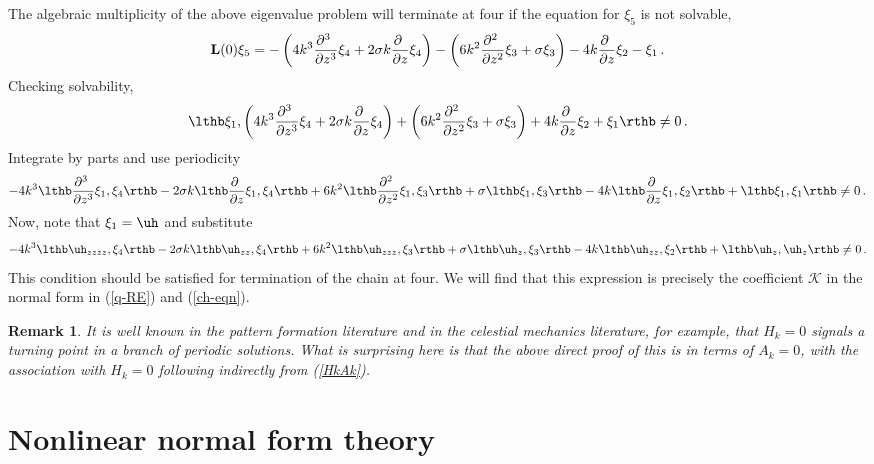 \documentclass[10pt]{article}
\newtheorem{rmk}[thm]{Remark}
\begin{document}
The algebraic multiplicity of the above eigenvalue problem will terminate at
four if the equation for $\xi_5$ is not solvable,
%
\begin{equation}\label{xi5-eqn}
{\bf L}(0)\xi_5 = -\left( 4k^3 \frac{\partial^3\ }{\partial z^3}\xi_4
 + 2\sigma k \frac{\partial\ }{\partial z}\xi_4\right) -
\left( 6k^2\frac{\partial^2\ }{\partial z^2}\xi_3 + \sigma\xi_3\right)
 - 4k \frac{\partial\ }{\partial z}\xi_2 - \xi_1\,.
\end{equation}
%
Checking solvability,
\[
\lthb \xi_1,\left( 4k^3 \frac{\partial^3\ }{\partial z^3}\xi_4
 + 2\sigma k \frac{\partial\ }{\partial z}\xi_4\right) +
\left( 6k^2\frac{\partial^2\ }{\partial z^2}\xi_3 + \sigma\xi_3\right)
 + 4k \frac{\partial\ }{\partial z}\xi_2 + \xi_1\rthb \neq 0 \,.
\]
Integrate by parts and use periodicity
\[
-4k^3\lthb \frac{\partial^3\ }{\partial z^3}\xi_1,\xi_4\rthb
-2\sigma k \lthb \frac{\partial\ }{\partial z}\xi_1,\xi_4\rthb
 + 6k^2\lthb \frac{\partial^2\ }{\partial z^2}\xi_1,\xi_3\rthb
+ \sigma \lthb\xi_1,\xi_3\rthb 
 - 4k \lthb\frac{\partial\ }{\partial z}\xi_1,\xi_2\rthb
 + \lthb\xi_1,\xi_1\rthb \neq 0 \,.
\]
Now, note that $\xi_1=\uh$ and substitute
%
\begin{equation}\label{xi5-Kappa}
-4k^3\lthb \uh_{zzzz},\xi_4\rthb
-2\sigma k \lthb \uh_{zz},\xi_4\rthb
 + 6k^2\lthb \uh_{zzz} , \xi_3\rthb
+ \sigma \lthb \uh_z,\xi_3\rthb 
 - 4k \lthb \uh_{zz},\xi_2\rthb
 + \lthb\uh_z,\uh_z\rthb \neq 0 \,.
\end{equation}
%
This condition should be satisfied for termination of the chain at four. We will
find that this expression is precisely the coefficient $\mathscr{K}$ in the
normal form in (\ref{q-RE}) and (\ref{ch-eqn}).

\begin{rmk} It is well known in the  pattern formation literature and
in the celestial mechanics literature, for example, that $H_k=0$ signals a
turning point in a branch of periodic solutions.  What is surprising here is
that the above direct proof of this is in terms of $A_k=0$, with the association
with $H_k=0$ following indirectly from (\ref{HkAk}).
\end{rmk}




\section{Nonlinear normal form theory}
\setcounter{equation}{0}
\label{sec-normalform}
\end{document}
